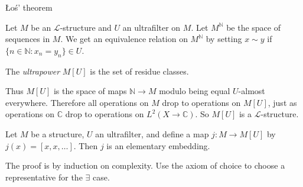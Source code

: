 \documentclass[10pt]{beamer}
\newcommand{\NN}{\mathbb{N}}
\newcommand{\CC}{\mathbb{C}}
\begin{document}
\begin{frame}{Łoś' theorem}
\begin{definition}
    Let $M$ be an $\mathcal L$-structure and $U$ an ultrafilter on $M$.
    Let $M^\NN$ be the space of sequences in $M$. We get an equivalence relation on $M^\NN$ by setting $x \sim y$ if $\{n \in \NN: x_n = y_n\} \in U$.

\pause

    The \emph{ultrapower} $M[U]$ is the set of residue classes.
\end{definition}

\pause

    Thus $M[U]$ is the space of maps $\NN \to M$ modulo being equal $U$-almost everywhere. Therefore all operations on $M$ drop to operations on $M[U]$, just as operations on $\CC$ drop to operations on $L^2(X \to \CC)$. So $M[U]$ is a $\mathcal L$-structure.

\pause

    \begin{theorem}[Łoś]
        Let $M$ be a structure, $U$ an ultrafilter, and define a map $j: M \to M[U]$ by $j(x) = [x, x, \dots]$.
        Then $j$ is an elementary embedding.
    \end{theorem}

\pause

    The proof is by induction on complexity. Use the axiom of choice to choose a representative for the $\exists$ case.
\end{frame}
\end{document}
